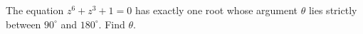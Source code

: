 The equation $z^6+z^3+1=0$ has exactly one root whose argument $\theta$ lies strictly between $90^\circ$ and $180^\circ$. Find $\theta$.
